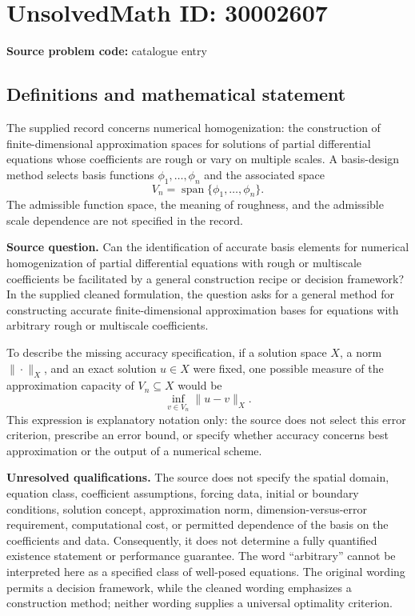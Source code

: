 \documentclass[11pt]{article}
\begin{document}
\section*{UnsolvedMath ID: 30002607}
\textbf{Source problem code:} catalogue entry
\subsection{Definitions and mathematical statement}
The supplied record concerns numerical homogenization: the construction of finite-dimensional approximation spaces for solutions of partial differential equations whose coefficients are rough or vary on multiple scales. A basis-design method selects basis functions \(\phi_1,\ldots,\phi_n\) and the associated space
\[
V_n=\operatorname{span}\{\phi_1,\ldots,\phi_n\}.
\]
The admissible function space, the meaning of roughness, and the admissible scale dependence are not specified in the record.

\textbf{Source question.} Can the identification of accurate basis elements for numerical homogenization of partial differential equations with rough or multiscale coefficients be facilitated by a general construction recipe or decision framework? In the supplied cleaned formulation, the question asks for a general method for constructing accurate finite-dimensional approximation bases for equations with arbitrary rough or multiscale coefficients.

To describe the missing accuracy specification, if a solution space \(X\), a norm \(\|\cdot\|_X\), and an exact solution \(u\in X\) were fixed, one possible measure of the approximation capacity of \(V_n\subseteq X\) would be
\[
\inf_{v\in V_n}\|u-v\|_X.
\]
This expression is explanatory notation only: the source does not select this error criterion, prescribe an error bound, or specify whether accuracy concerns best approximation or the output of a numerical scheme.

\textbf{Unresolved qualifications.} The source does not specify the spatial domain, equation class, coefficient assumptions, forcing data, initial or boundary conditions, solution concept, approximation norm, dimension-versus-error requirement, computational cost, or permitted dependence of the basis on the coefficients and data. Consequently, it does not determine a fully quantified existence statement or performance guarantee. The word ``arbitrary'' cannot be interpreted here as a specified class of well-posed equations. The original wording permits a decision framework, while the cleaned wording emphasizes a construction method; neither wording supplies a universal optimality criterion.
\end{document}
